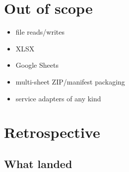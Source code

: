 \section{Out of scope}\label{record-191-out-of-scope}

\begin{itemize}
\tightlist
\item
  file reads/writes
\item
  XLSX
\item
  Google Sheets
\item
  multi-sheet ZIP/manifest packaging
\item
  service adapters of any kind
\end{itemize}

\section{Retrospective}\label{record-191-retrospective}

\subsection{What landed}\label{record-191-what-landed}

